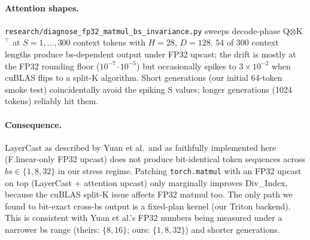 \documentclass{article}
\begin{document}
\paragraph{Attention shapes.}
\texttt{research/diagnose\_fp32\_matmul\_bs\_invariance.py} sweeps
decode-phase Q$\otimes$K$^\top$ at $S\!=\!1,\dots,300$ context tokens
with $H\!=\!28$, $D\!=\!128$. $54$ of $300$ context lengths produce
bs-dependent output under FP32 upcast; the drift is mostly at the FP32
rounding floor ($10^{-7}$--$10^{-5}$) but occasionally spikes to
$3\!\times\!10^{-2}$ when cuBLAS flips to a split-K algorithm. Short
generations (our initial 64-token smoke test) coincidentally avoid the
spiking S values; longer generations (1024 tokens) reliably hit them.

\paragraph{Consequence.}
LayerCast as described by Yuan et al.\ and as faithfully implemented
here (F.linear-only FP32 upcast) does not produce bit-identical token
sequences across $bs\!\in\!\{1,8,32\}$ in our stress regime. Patching
\texttt{torch.matmul} with an FP32 upcast on top
(LayerCast + attention upcast) only marginally improves Div\_Index,
because the cuBLAS split-K issue affects FP32 matmul too. The only
path we found to bit-exact cross-bs output is a fixed-plan kernel
(our Triton backend). This is consistent with Yuan et al.'s FP32
numbers being measured under a narrower bs range (theirs: $\{8,16\}$;
ours: $\{1,8,32\}$) and shorter generations.
\end{document}
